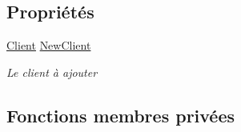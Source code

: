 \subsection*{Propriétés}
\begin{DoxyCompactItemize}
\item 
\mbox{\hyperlink{class_m_t_connect_agent_1_1_model_1_1_client}{Client}} \mbox{\hyperlink{class_m_t_connect_agent_1_1_form_ajout_client_a0866b4e0d65bb3844726b9f18c8af35e}{New\+Client}}
\begin{DoxyCompactList}\small\item\em Le client à ajouter \end{DoxyCompactList}\end{DoxyCompactItemize}
\subsection*{Fonctions membres privées}
